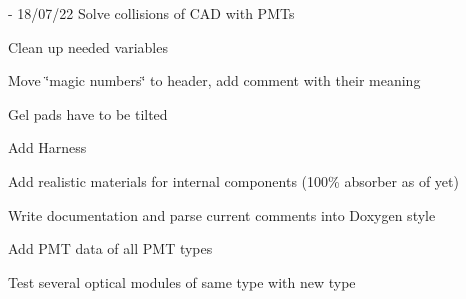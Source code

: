 \begin{DoxyRefList}
\item[File \mbox{\hyperlink{_o_m_sim_l_o_m18_8cc}{OMSim\+LOM18.cc}} ]\label{todo__todo000006}%
%
-\/ 18/07/22 Solve collisions of CAD with PMTs
\begin{DoxyItemize}
\item Clean up needed variables
\item Move \char`\"{}magic numbers\char`\"{} to header, add comment with their meaning
\item Gel pads have to be tilted
\item Add Harness
\item Add realistic materials for internal components (100\% absorber as of yet)
\item Write documentation and parse current comments into Doxygen style  
\end{DoxyItemize}
\item[Member \mbox{\hyperlink{class_o_m_sim_p_m_t_response_a80b379bc78ca06d23011703aae3341d7}{OMSim\+PMTResponse\+::OMSim\+PMTResponse}} ()]\label{todo__todo000001}%
%
Add PMT data of all PMT types  
\item[Member \mbox{\hyperlink{class_o_m_sim_sensitive_detector_a8a0377d3ae13a48c1b3b08cd56bfaa08}{OMSim\+Sensitive\+Detector\+::m\+\_\+boundary\+Process}} ]\label{todo__todo000002}%
%
Test several optical modules of same type with new type 
\end{DoxyRefList}